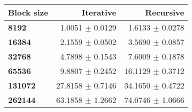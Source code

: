\begin{tabular}{lrr}\toprule
\textbf{Block size}  & \textbf{Iterative} & \textbf{Recursive}\\\midrule
\textbf{8192}  & 1.0051 $\pm$ 0.0129 & 1.6133 $\pm$ 0.0278\\
\textbf{16384}  & 2.1559 $\pm$ 0.0502 & 3.5690 $\pm$ 0.0857\\
\textbf{32768}  & 4.7898 $\pm$ 0.1543 & 7.6009 $\pm$ 0.1878\\
\textbf{65536}  & 9.8807 $\pm$ 0.2452 & 16.1129 $\pm$ 0.3712\\
\textbf{131072}  & 27.8158 $\pm$ 0.7146 & 34.1650 $\pm$ 0.4722\\
\textbf{262144} & 63.1858 $\pm$ 1.2662 & 74.0746 $\pm$ 1.0666\\
\bottomrule
\end{tabular}
